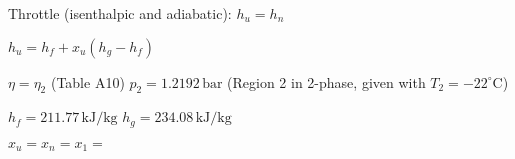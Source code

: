 Throttle (isenthalpic and adiabatic):  
\( h_u = h_n \)  

\( h_u = h_f + x_u (h_g - h_f) \)  

\( \eta = \eta_2 \) (Table A10)  
\( p_2 = 1.2192 \, \text{bar} \) (Region 2 in 2-phase, given with \( T_2 = -22^\circ \text{C} \))  

\( h_f = 211.77 \, \text{kJ/kg} \)  
\( h_g = 234.08 \, \text{kJ/kg} \)  

\( x_u = x_n = x_1 = \)